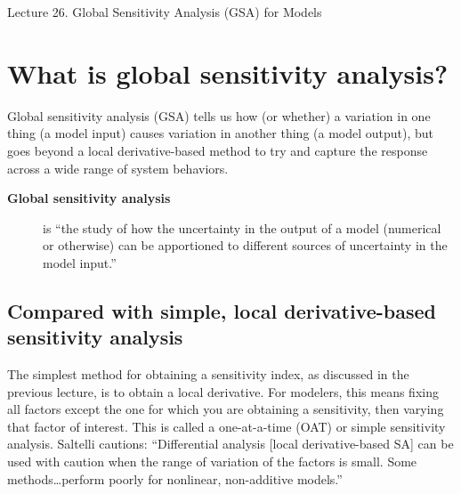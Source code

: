 \documentclass[10pt]{article}
\begin{document}
   \noindent
   \begin{center}

   \hrulefill
   
   \vspace{5pt}
   
   \vspace{0pt}
   
   {\Large \hfill  Lecture 26.  
Global Sensitivity Analysis (GSA) for Models
}
   \vspace{5pt}
   
  
   \hrulefill
   \end{center}

 {}

\section{What is global sensitivity analysis?}

Global sensitivity analysis (GSA) tells us how (or whether) a variation in one thing (a model input) causes variation in another thing (a model output), but goes beyond a local derivative-based method to try and capture the response across a wide range of system behaviors. 

\begin{description}
\item [\textbf{Global sensitivity analysis}] is  ``the study of how the uncertainty in the output of a model (numerical or otherwise) can be apportioned to different sources of uncertainty in the model input.'' \cite{Saltelli2004-ga}
\end{description}



\subsection{Compared with simple, local derivative-based sensitivity analysis}

The simplest method for obtaining a sensitivity index, as discussed in the previous lecture, is to obtain a local derivative. For modelers, this means fixing all factors except the one for which you are obtaining a sensitivity, then varying that factor of interest. This is called a one-at-a-time (OAT) or simple sensitivity analysis. Saltelli cautions: ``Differential analysis [local derivative-based SA] can be used with caution when the range of variation of the factors is small. Some methods\ldots perform poorly for nonlinear, non-additive models.'' \cite{Saltelli2009-tz}
\end{document}
